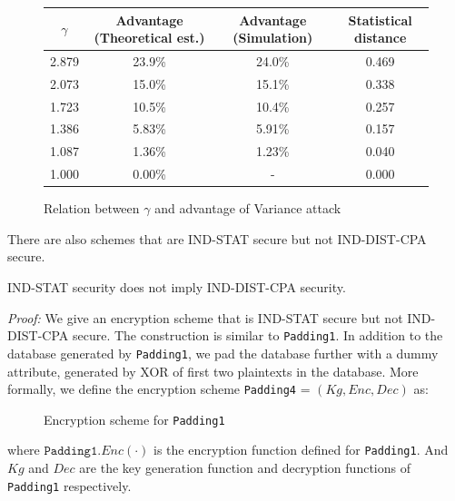 \begin{figure}[H]
	\centering
	\begin{tabular}{cccc}
		$\gamma$ & Advantage (Theoretical est.) & Advantage (Simulation) & Statistical distance \\ \hline
		2.879    & 23.9\%	 & 24.0\% 	& 0.469 \\
		2.073	 & 15.0\%	 & 15.1\%	& 0.338 \\
		1.723    & 10.5\%    & 10.4\%	& 0.257 \\
		1.386    & 5.83\%    & 5.91\%	& 0.157 \\
		1.087    & 1.36\%    & 1.23\%	& 0.040  \\
		1.000    & 0.00\%    & -		& 0.000
	\end{tabular}
	\caption{Relation between $\gamma$ and advantage of Variance attack}
	\label{VA advantage table}
\end{figure}




There are also schemes that are IND-STAT secure but not IND-DIST-CPA secure.
\begin{theorem}
	IND-STAT security does not imply IND-DIST-CPA security.
\end{theorem}

\textit{Proof:} We give an encryption scheme that is IND-STAT secure but not IND-DIST-CPA secure. The construction is similar to \texttt{Padding1}. In addition to the database generated by \texttt{Padding1}, we pad the database further with a dummy attribute, generated by XOR of first two plaintexts in the database. More formally, we define the encryption scheme \texttt{Padding4} = $(Kg, Enc, Dec)$ as:

\begin{figure}[H]
	\begin{center}
		\begin{pchstack}
		\end{pchstack}
	\end{center}
	\caption{Encryption scheme for \texttt{Padding1}}
\end{figure}
where $\texttt{Padding1.}Enc(\cdot)$ is the encryption function defined for \texttt{Padding1}. And $Kg$ and $Dec$ are the key generation function and decryption functions of \texttt{Padding1} respectively.

